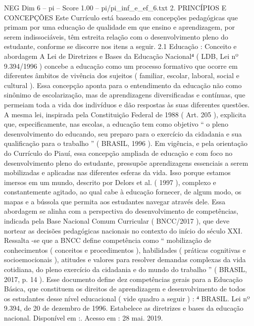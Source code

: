 \begin{textsample}{NEG Dim 6 – pi – Score 1.00 – pi/pi\_inf\_e\_ef\_6.txt}  \label{ex:f6_neg_099}
2.
PRINCÍPIOS E CONCEPÇÕES Este Currículo está baseado em concepções pedagógicas que primam por uma educação de qualidade em que ensino e aprendizagem, por serem indissociáveis, têm estreita relação com o desenvolvimento pleno do estudante, conforme se discorre nos itens a seguir. 2.1 Educação : Conceito e abordagem A Lei de Diretrizes e Bases da Educação Nacional⁴ ( LDB, Lei nº 9.394/1996 ) concebe a educação como um processo formativo que ocorre em diferentes âmbitos de vivência dos sujeitos ( familiar, escolar, laboral, social e cultural ).
Essa concepção aponta para o entendimento da educação não como sinônimo de escolarização, mas de aprendizagens diversificadas e contínuas, que permeiam toda a vida dos indivíduos e dão respostas às suas diferentes questões.
A mesma lei, inspirada pela Constituição Federal de 1988 ( Art. 205 ), explicita que, especificamente, nas escolas, a educação tem como objetivo “ o pleno desenvolvimento do educando, seu preparo para o exercício da cidadania e sua qualificação para o trabalho ” ( BRASIL, 1996 ).
Em vigência, e pela orientação do Currículo do Piauí, essa concepção ampliada de educação e com foco no desenvolvimento pleno do estudante, pressupõe aprendizagens essenciais a serem mobilizadas e aplicadas nas diferentes esferas da vida.
Isso porque estamos imersos em um mundo, descrito por Delors et al. ( 1997 ), complexo e constantemente agitado, ao qual cabe à educação fornecer, de algum modo, os mapas e a bússola que permita aos estudantes navegar através dele.
Essa abordagem se alinha com a perspectiva do desenvolvimento de competências, indicada pela Base Nacional Comum Curricular ( BNCC/2017 ), que deve nortear as decisões pedagógicas nacionais no contexto do início do século XXI.
Ressalta -se que a BNCC define competência como “ mobilização de conhecimentos ( conceitos e procedimentos ), habilidades ( práticas cognitivas e socioemocionais ), atitudes e valores para resolver demandas complexas da vida cotidiana, do pleno exercício da cidadania e do mundo do trabalho ” ( BRASIL, 2017, p. 14 ).
Esse documento define dez competências gerais para a Educação Básica, que constituem os direitos de aprendizagem e desenvolvimento de todos os estudantes desse nível educacional ( vide quadro a seguir ) : ⁴ BRASIL.
Lei nº 9.394, de 20 de dezembro de 1996.
Estabelece as diretrizes e bases da educação nacional.
Disponível em :.
Acesso em : 28 mai. 2019.

\end{textsample}
